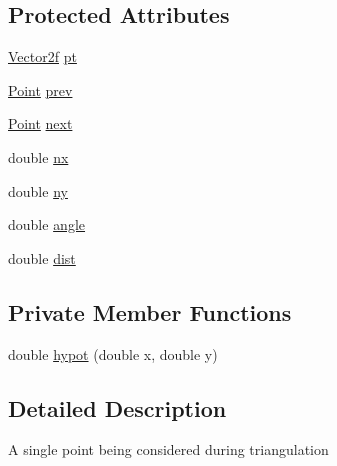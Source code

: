 \subsection*{Protected Attributes}
\begin{DoxyCompactItemize}
\item 
\mbox{\hyperlink{classorg_1_1newdawn_1_1slick_1_1geom_1_1_vector2f}{Vector2f}} \mbox{\hyperlink{classorg_1_1newdawn_1_1slick_1_1geom_1_1_mann_triangulator_1_1_point_afd78802a3fe9d6abf60a218d24be56aa}{pt}}
\item 
\mbox{\hyperlink{classorg_1_1newdawn_1_1slick_1_1geom_1_1_mann_triangulator_1_1_point}{Point}} \mbox{\hyperlink{classorg_1_1newdawn_1_1slick_1_1geom_1_1_mann_triangulator_1_1_point_aada0547222c51b32a918839db2eca9f2}{prev}}
\item 
\mbox{\hyperlink{classorg_1_1newdawn_1_1slick_1_1geom_1_1_mann_triangulator_1_1_point}{Point}} \mbox{\hyperlink{classorg_1_1newdawn_1_1slick_1_1geom_1_1_mann_triangulator_1_1_point_a5679974de3d6ea0e554138b1d4e19123}{next}}
\item 
double \mbox{\hyperlink{classorg_1_1newdawn_1_1slick_1_1geom_1_1_mann_triangulator_1_1_point_a24e1b6fd160503d3a3ecebb304e166b3}{nx}}
\item 
double \mbox{\hyperlink{classorg_1_1newdawn_1_1slick_1_1geom_1_1_mann_triangulator_1_1_point_ae59a8e9d59fe7ba6c457aac1bce71e6d}{ny}}
\item 
double \mbox{\hyperlink{classorg_1_1newdawn_1_1slick_1_1geom_1_1_mann_triangulator_1_1_point_adbff3dca6beaef071adb22b814f0e7ae}{angle}}
\item 
double \mbox{\hyperlink{classorg_1_1newdawn_1_1slick_1_1geom_1_1_mann_triangulator_1_1_point_aae1f87d6838e79a1423c6fc426ce45c5}{dist}}
\end{DoxyCompactItemize}
\subsection*{Private Member Functions}
\begin{DoxyCompactItemize}
\item 
double \mbox{\hyperlink{classorg_1_1newdawn_1_1slick_1_1geom_1_1_mann_triangulator_1_1_point_a78efe3aa0584448617fc6132371799cd}{hypot}} (double x, double y)
\end{DoxyCompactItemize}


\subsection{Detailed Description}
A single point being considered during triangulation

